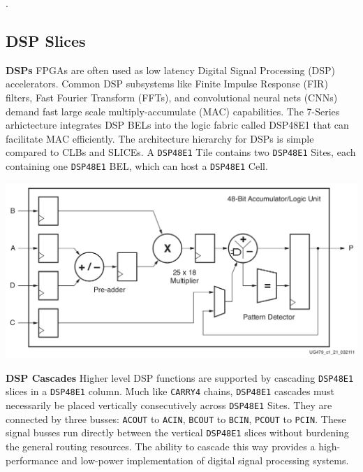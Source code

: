 \begin{multicols}{2}
\vspace{1.0cm}
.

\newpage
\subsection{DSP Slices}

\textbf{DSPs} \quad 
FPGAs are often used as low latency Digital Signal Processing (DSP) accelerators. 
Common DSP subsystems like Finite Impulse Response (FIR) filters, Fast Fourier Transform (FFTs), and convolutional neural nets (CNNs) demand fast large scale multiply-accumulate (MAC) capabilities. 
The 7-Series arhictecture integrates DSP BELs into the logic fabric called DSP48E1 that can facilitate MAC efficiently. 
The architecture hierarchy for DSPs is simple compared to CLBs and SLICEs. 
A \texttt{DSP48E1} Tile contains two \texttt{DSP48E1} Sites, each containing one \texttt{DSP48E1} BEL, which can host a \texttt{DSP48E1} Cell. 

{
    \centering
    \includegraphics[width=\columnwidth]{figures/dsp_diagram.png}
    \label{dsp_diagram}
}
\vspace{0.5cm}

\textbf{DSP Cascades} \quad 
Higher level DSP functions are supported by cascading \texttt{DSP48E1} slices in a \texttt{DSP48E1} column.
Much like \texttt{CARRY4} chains, \texttt{DSP48E1} cascades must necessarily be placed vertically consecutively across \texttt{DSP48E1} Sites. 
They are connected by three busses: \texttt{ACOUT} to \texttt{ACIN}, \texttt{BCOUT} to \texttt{BCIN}, \texttt{PCOUT} to \texttt{PCIN}.
These signal busses run directly between the vertical \texttt{DSP48E1} slices without burdening the general routing resources. 
The ability to cascade this way provides a high-performance and low-power implementation of digital signal processing systems. 


\end{multicols}
